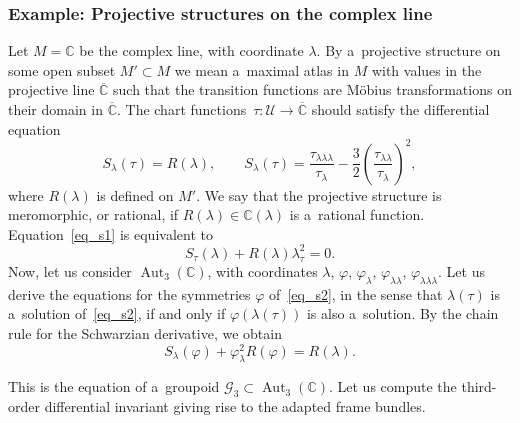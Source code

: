 \documentclass[10pt,a4paper]{amsart}
\numberwithin{equation}{section}
\theoremstyle{definition}
\begin{document}
\subsubsection{Example: Projective structures on the complex line}

Let $M= \mathbb C$ be the complex line, with coordinate $\lambda$. By a~projective structure {on} some open subset $M'\subset M$ we mean a~maximal atlas in $M$ with values {in} the projective line $\overline{\mathbb C}$ such that the transition functions are M\"obius transformations on their domain in $\overline{\mathbb C}$. The chart functions~${\tau\colon \mathcal U \to \overline{\mathbb C}}$ should satisfy the differential equation
\begin{equation}\label{eq_s1}
S_\lambda(\tau) = R(\lambda), \qquad S_{\lambda}(\tau) = \frac{\tau_{\lambda\lambda\lambda}}{\tau_\lambda} - \frac{3}{2}\left(\frac{\tau_{\lambda\lambda}}{\tau_{\lambda}}\right)^2,
\end{equation}
where $R(\lambda)$ is defined on $M'$. We say that the projective structure is meromorphic, or rational, if $R(\lambda) \in \mathbb C(\lambda)$ is a~rational function. Equation~\eqref{eq_s1} is equivalent to
\begin{equation}\label{eq_s2}
S_\tau(\lambda) + R(\lambda)\lambda_{\tau}^{2} = 0.
\end{equation}
Now, let us consider $\operatorname{Aut}_3(\mathbb C)$, with coordinates $\lambda$, $\varphi$, $\varphi_{\lambda}$, $\varphi_{\lambda\lambda}$, $\varphi_{\lambda\lambda\lambda}$. Let us derive the equations for the symmetries $\varphi$ of~\eqref{eq_s2}, in the sense that $\lambda(\tau)$ is a~solution of~\eqref{eq_s2}, if and only if $\varphi(\lambda(\tau))$ is also a~solution. By the chain rule for the Schwarzian derivative, we obtain
\begin{equation}\label{eq_kummer}
S_\lambda(\varphi) + \varphi_\lambda^2R(\varphi)=R(\lambda).
\end{equation}

This is the equation of a~groupoid $\mathcal G_3 \subset \operatorname{Aut}_3(\mathbb C)$. Let us compute the third-order differential invariant giving rise to the adapted frame bundles.
\end{document}
